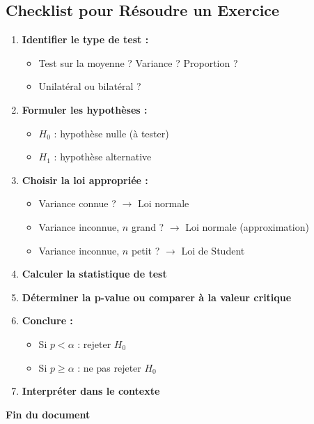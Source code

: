 \documentclass[11pt,a4paper]{article}
\begin{document}
\subsection{Checklist pour Résoudre un Exercice}

\begin{enumerate}
    \item \textbf{Identifier le type de test :}
    \begin{itemize}
        \item Test sur la moyenne ? Variance ? Proportion ?
        \item Unilatéral ou bilatéral ?
    \end{itemize}
    
    \item \textbf{Formuler les hypothèses :}
    \begin{itemize}
        \item $H_0$ : hypothèse nulle (à tester)
        \item $H_1$ : hypothèse alternative
    \end{itemize}
    
    \item \textbf{Choisir la loi appropriée :}
    \begin{itemize}
        \item Variance connue ? $\to$ Loi normale
        \item Variance inconnue, $n$ grand ? $\to$ Loi normale (approximation)
        \item Variance inconnue, $n$ petit ? $\to$ Loi de Student
    \end{itemize}
    
    \item \textbf{Calculer la statistique de test}
    
    \item \textbf{Déterminer la p-value ou comparer à la valeur critique}
    
    \item \textbf{Conclure :}
    \begin{itemize}
        \item Si $p < \alpha$ : rejeter $H_0$
        \item Si $p \geq \alpha$ : ne pas rejeter $H_0$
    \end{itemize}
    
    \item \textbf{Interpréter dans le contexte}
\end{enumerate}

\vspace{2cm}

\begin{center}
\textbf{Fin du document}
\end{center}
\end{document}
